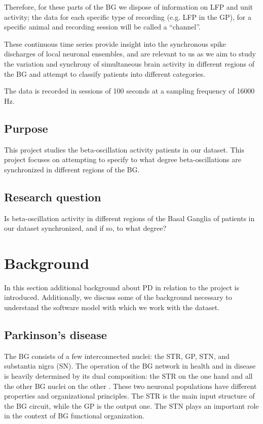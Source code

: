 \documentclass{article}
\begin{document}
Therefore, for these parts of the BG we dispose of information on LFP and unit activity; the data for each specific type of recording (e.g. LFP in the GP), for a specific animal and recording session will be called a “channel”.

These continuous time series provide insight into the synchronous spike discharges of local neuronal ensembles, and are relevant to us as we aim to study the variation and synchrony of simultaneous brain activity in different regions of the BG and attempt to classify patients into different categories. 

The data is recorded in sessions of 100 seconds at a sampling frequency of 16000 Hz.

\subsection{Purpose}
This project studies the beta-oscillation activity patients in our dataset. This project focuses on attempting to specify to what degree beta-oscillations are synchronized in different regions of the BG.

\subsection{Research question}
Is beta-oscillation activity in different regions of the Basal Ganglia of patients in our dataset synchronized, and if so, to what degree?

\newpage
\section{Background}
In this section additional background about PD in relation to the project is introduced. Additionally, we discuss some of the background necessary to understand the software model with which we work with the dataset.

\subsection{Parkinson's disease}
The BG consists of a few interconnected nuclei: the STR, GP, STN, and substantia nigra (SN). The operation of the BG network in health and in disease is heavily determined by its dual composition: the STR on the one hand and all the other BG nuclei on the other \citep{DeMaags}. These two neuronal populations have different properties and organizational principles.
The STR is the main input structure of the BG circuit, while the GP is the output one. The STN plays an important role in the context of BG functional organization.
\end{document}
